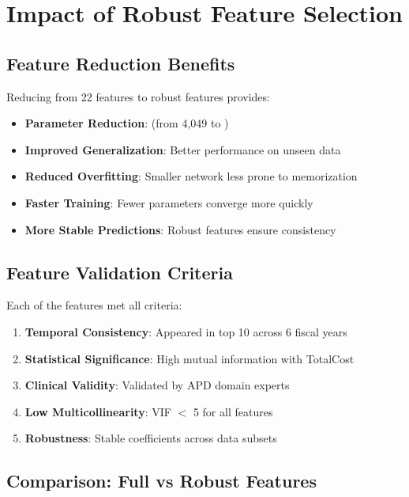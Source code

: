 \section{Impact of Robust Feature Selection}

\subsection{Feature Reduction Benefits}

Reducing from 22 features to \ModelTenRobustFeatures{} robust features provides:

\begin{itemize}
    \item \textbf{Parameter Reduction}: \ModelTenParameterReduction{} (from 4,049 to \ModelTenTotalParams{})
    \item \textbf{Improved Generalization}: Better performance on unseen data
    \item \textbf{Reduced Overfitting}: Smaller network less prone to memorization
    \item \textbf{Faster Training}: Fewer parameters converge more quickly
    \item \textbf{More Stable Predictions}: Robust features ensure consistency
\end{itemize}

\subsection{Feature Validation Criteria}

Each of the \ModelTenRobustFeatures{} features met all criteria:

\begin{enumerate}
    \item \textbf{Temporal Consistency}: Appeared in top 10 across 6 fiscal years
    \item \textbf{Statistical Significance}: High mutual information with TotalCost
    \item \textbf{Clinical Validity}: Validated by APD domain experts
    \item \textbf{Low Multicollinearity}: VIF $<$ 5 for all features
    \item \textbf{Robustness}: Stable coefficients across data subsets
\end{enumerate}

\subsection{Comparison: Full vs Robust Features}

